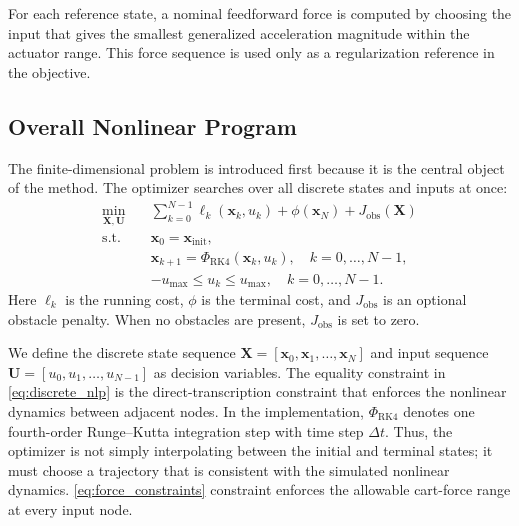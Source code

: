 \documentclass[conference]{IEEEtran}
\begin{document}
For each reference state, a nominal feedforward force is computed by choosing the input that gives the smallest generalized acceleration magnitude within the actuator range. This force sequence is used only as a regularization reference in the objective.

\subsection{Overall Nonlinear Program}
The finite-dimensional problem is introduced first because it is the central object of the method. The optimizer searches over all discrete states and inputs at once:
\begin{align}
\min_{\bm{X},\bm{U}} \quad &
\sum_{k=0}^{N-1}\ell_k(\bm{x}_k,u_k)
+
\phi(\bm{x}_N)
+
J_{\mathrm{obs}}(\bm{X})
\label{eq:discrete_nlp}\\
\text{s.t.}\quad &
\bm{x}_0=\bm{x}_{\mathrm{init}},\\
& \bm{x}_{k+1}=\Phi_{\mathrm{RK4}}(\bm{x}_k,u_k),
\quad k=0,\ldots,N-1,\\
& -u_{\max}\leq u_k\leq u_{\max},
\quad k=0,\ldots,N-1 .
\label{eq:force_constraints}
\end{align}
Here $\ell_k$ is the running cost, $\phi$ is the terminal cost, and $J_{\mathrm{obs}}$ is an optional obstacle penalty. When no obstacles are present, $J_{\mathrm{obs}}$ is set to zero.  

We define the discrete state sequence $\bm{X}=[\bm{x}_0,\bm{x}_1,\ldots,\bm{x}_N]$ and input sequence $\bm{U}=[u_0,u_1,\ldots,u_{N-1}]$ as decision variables. The equality constraint in \eqref{eq:discrete_nlp} is the direct-transcription constraint that enforces the nonlinear dynamics between adjacent nodes. In the implementation, $\Phi_{\mathrm{RK4}}$ denotes one fourth-order Runge--Kutta integration step with time step $\Delta t$. Thus, the optimizer is not simply interpolating between the initial and terminal states; it must choose a trajectory that is consistent with the simulated nonlinear dynamics. \eqref{eq:force_constraints} constraint enforces the allowable cart-force range at every input node.
\end{document}
